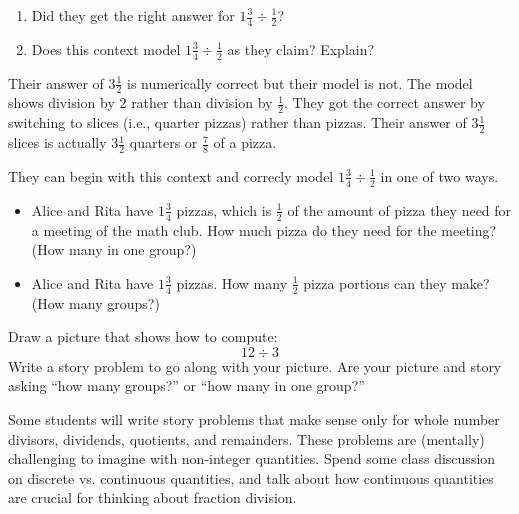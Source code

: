 \documentclass[nooutcomes]{ximera}
\begin{document}
\begin{problem}
\begin{enumerate}
\item Did they get the right answer for $1\frac{3}{4} \div \frac{1}{2}$?  
\item Does this context model $1\frac{3}{4} \div \frac{1}{2}$ as they claim?  Explain?  
\end{enumerate}

\begin{teachingnote}
Their answer of $3\frac{1}{2}$ is numerically correct but their model is not.  The model shows division by $2$ rather than division by $\frac{1}{2}$.  They got the correct answer by switching to slices (i.e., quarter pizzas) rather than pizzas.  Their answer of $3\frac{1}{2}$ slices is actually $3\frac{1}{2}$ quarters or $\frac{7}{8}$ of a pizza.

They can begin with this context and correcly model $1\frac{3}{4} \div \frac{1}{2}$ in one of two ways. 
\begin{itemize}
\item Alice and Rita have $1\frac{3}{4}$ pizzas, which is $\frac{1}{2}$ of the amount of pizza they need for a meeting of the math club.  How much pizza do they need for the meeting? (How many in one group?)
\item Alice and Rita have $1\frac{3}{4}$ pizzas.  How many $\frac{1}{2}$ pizza portions can they make? (How many groups?)
\end{itemize}
\end{teachingnote}
\vspace{1in}
\end{problem}


\begin{problem}
Draw a picture that shows how to compute:
\[
12\div 3
\]
Write a story problem to go along with your picture.  Are your picture and story asking ``how many groups?'' or ``how many in
one group?''
\vspace{2in}
\end{problem}

\begin{teachingnote}
Some students will write story problems that make sense only for whole number divisors, dividends, quotients, and remainders.  These problems are (mentally) challenging to imagine with non-integer quantities.  Spend some class discussion on discrete vs. continuous quantities, and talk about how continuous quantities are crucial for thinking about fraction division.  
\end{teachingnote}
\end{document}
